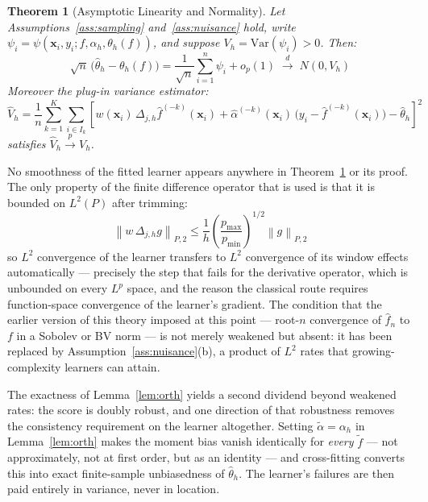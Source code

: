 \documentclass[12pt]{article}
\newtheorem{theorem}{Theorem}
\newcommand{\norm}[1]{\left\| #1 \right\|}
\newcommand{\fn}{\hat{f}_n}
\newcommand{\xrightarrowp}{\xrightarrow{p}}
\newcommand{\Dh}{\Delta_{j,h}}
\newcommand{\Ptwo}[1]{\norm{#1}_{P,2}}
\begin{document}
	\begin{theorem}[Asymptotic Linearity and Normality]
		\label{thm:main}
		Let Assumptions~\ref{ass:sampling} and~\ref{ass:nuisance} hold, write
		$\psi_i = \psi(\mathbf{x}_i, y_i; f, \alpha_h, \theta_h(f))$, and suppose
		$V_h = \mathrm{Var}(\psi_i) > 0$. Then:
		\begin{equation}
			\sqrt{n}\,\bigl(\hat{\theta}_h - \theta_h(f)\bigr)
			= \frac{1}{\sqrt{n}} \sum_{i=1}^n \psi_i + o_p(1)
			\;\xrightarrow{d}\; N(0, V_h)
		\end{equation}
		Moreover the plug-in variance estimator:
		\begin{equation}
			\hat{V}_h = \frac{1}{n} \sum_{k=1}^{K} \sum_{i \in I_k}
			\left[ w(\mathbf{x}_i)\, \Dh \hat{f}^{(-k)}(\mathbf{x}_i)
			+ \hat{\alpha}^{(-k)}(\mathbf{x}_i)\,
			\bigl(y_i - \hat{f}^{(-k)}(\mathbf{x}_i)\bigr)
			- \hat{\theta}_h \right]^2
		\end{equation}
		satisfies $\hat{V}_h \xrightarrowp V_h$.
	\end{theorem}
	
	No smoothness of the fitted learner appears anywhere in
	Theorem~\ref{thm:main} or its proof. The only property of the finite difference
	operator that is used is that it is bounded on $L^2(P)$ after trimming:
	\begin{equation}
		\Ptwo{w\, \Dh g} \leq
		\frac{1}{h} \left(\frac{p_{\max}}{p_{\min}}\right)^{1/2} \Ptwo{g}
		\label{eq:opbound}
	\end{equation}
	so $L^2$ convergence of the learner transfers to $L^2$ convergence of its window
	effects automatically --- precisely the step that fails for the derivative operator,
	which is unbounded on every $L^p$ space, and the reason the classical route
	requires function-space convergence of the learner's gradient. The condition that
	the earlier version of this theory imposed at this point --- root-$n$ convergence
	of $\fn$ to $f$ in a Sobolev or BV norm --- is not merely weakened but absent: it
	has been replaced by Assumption~\ref{ass:nuisance}(b), a product of $L^2$ rates
	that growing-complexity learners can attain.
	
	The exactness of Lemma~\ref{lem:orth} yields a second dividend beyond weakened
	rates: the score is doubly robust, and one direction of that robustness removes the
	consistency requirement on the learner altogether. Setting
	$\tilde{\alpha} = \alpha_h$ in Lemma~\ref{lem:orth} makes the moment bias vanish
	identically for \emph{every} $\tilde{f}$ --- not approximately, not at first order,
	but as an identity --- and cross-fitting converts this into exact finite-sample
	unbiasedness of $\hat{\theta}_h$. The learner's failures are then paid entirely in
	variance, never in location.
	
\end{document}
